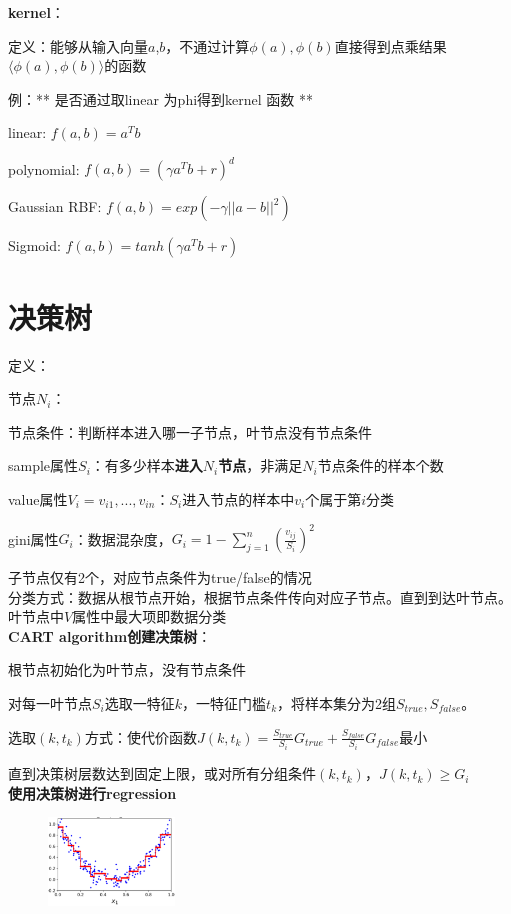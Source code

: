 \documentclass[UTF8]{ctexart}
\begin{document}
  \textbf{kernel}：

  \quad 定义：能够从输入向量$a$,$b$，不通过计算$\phi(a), \phi(b)$直接得到点乘结果$\langle \phi (a), \phi (b)\rangle $的函数

  \quad 例：** 是否通过取linear 为phi得到kernel 函数 **

  \quad \quad linear: $f(a, b) = a^Tb$

  \quad \quad polynomial: $f(a, b) = (\gamma a^Tb+r)^d$

  \quad \quad Gaussian RBF: $f(a, b) = exp(-\gamma ||a-b||^2)$

  \quad \quad Sigmoid: $f(a, b) = tanh(\gamma a^Tb + r)$

\section{决策树}
\noindent 定义：

  节点$N_i$：

  \quad 节点条件：判断样本进入哪一子节点，叶节点没有节点条件
  
  \quad sample属性$S_i$：有多少样本\textbf{进入$N_i$节点}，非满足$N_i$节点条件的样本个数

  \quad value属性$V_i = v_{i1}, ..., v_{in}$：$S_i$进入节点的样本中$v_i$个属于第$i$分类

  \quad gini属性$G_i$：数据混杂度，$G_i = 1-\sum_{j=1}^{n}(\frac{v_{ij}}{S_i})^2$
  
  \quad 子节点仅有2个，对应节点条件为true/false的情况\\
分类方式：数据从根节点开始，根据节点条件传向对应子节点。直到到达叶节点。叶节点中$V$属性中最大项即数据分类\\
\textbf{CART algorithm创建决策树}：

  根节点初始化为叶节点，没有节点条件
  
  对每一叶节点$S_i$选取一特征$k$，一特征门槛$t_k$，将样本集分为2组$S_{true}, S_{false}$。
  
  \quad 选取$(k, t_k)$方式：使代价函数$J(k, t_k) = \frac{S_{true}}{S_i}G_{true} + \frac{S_{false}}{S_i}G_{false}$最小

  直到决策树层数达到固定上限，或对所有分组条件$(k, t_k)$，$J(k, t_k) \geq G_i$\\
\textbf{使用决策树进行regression}

  \begin{figure}[H] %
    \centering %
    \includegraphics[width=0.3\textwidth]{note_images/deci_tree_regression.png} %
  \end{figure}
\end{document}
